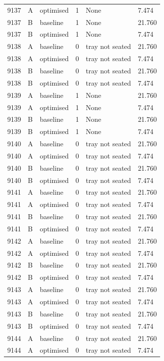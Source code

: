 \begin{longtable}{llllll}
9137 & A & optimised & 1 & None & 7.474 \\
9137 & B & baseline & 1 & None & 21.760 \\
9137 & B & optimised & 1 & None & 7.474 \\
9138 & A & baseline & 0 & tray not seated & 21.760 \\
9138 & A & optimised & 0 & tray not seated & 7.474 \\
9138 & B & baseline & 0 & tray not seated & 21.760 \\
9138 & B & optimised & 0 & tray not seated & 7.474 \\
9139 & A & baseline & 1 & None & 21.760 \\
9139 & A & optimised & 1 & None & 7.474 \\
9139 & B & baseline & 1 & None & 21.760 \\
9139 & B & optimised & 1 & None & 7.474 \\
9140 & A & baseline & 0 & tray not seated & 21.760 \\
9140 & A & optimised & 0 & tray not seated & 7.474 \\
9140 & B & baseline & 0 & tray not seated & 21.760 \\
9140 & B & optimised & 0 & tray not seated & 7.474 \\
9141 & A & baseline & 0 & tray not seated & 21.760 \\
9141 & A & optimised & 0 & tray not seated & 7.474 \\
9141 & B & baseline & 0 & tray not seated & 21.760 \\
9141 & B & optimised & 0 & tray not seated & 7.474 \\
9142 & A & baseline & 0 & tray not seated & 21.760 \\
9142 & A & optimised & 0 & tray not seated & 7.474 \\
9142 & B & baseline & 0 & tray not seated & 21.760 \\
9142 & B & optimised & 0 & tray not seated & 7.474 \\
9143 & A & baseline & 0 & tray not seated & 21.760 \\
9143 & A & optimised & 0 & tray not seated & 7.474 \\
9143 & B & baseline & 0 & tray not seated & 21.760 \\
9143 & B & optimised & 0 & tray not seated & 7.474 \\
9144 & A & baseline & 0 & tray not seated & 21.760 \\
9144 & A & optimised & 0 & tray not seated & 7.474 \\

\end{longtable}
